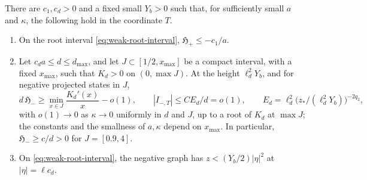 \begin{lemma}
\label{lem:weak-root-branches}
There are \(c_1,c_d>0\) and a fixed small \(Y_b>0\) such that, for
sufficiently small \(a\) and \(\kappa\), the following hold in the coordinate
\(T\).
\begin{enumerate}[label=\textup{(\roman*)}]
\item On the root interval \eqref{eq:weak-root-interval},
\(\mathfrak H_+\le-c_1/a\).
\item Let \(c_da\le d\le d_{\max}\), and let \(J\subset[1/2,x_{\max}]\) be
a compact interval, with a fixed \(x_{\max}\), such that \(K_d>0\) on
\((0,\max J)\). At the height \(\ell_d^2Y_b\), and for negative projected
states in \(J\),
\[
 d\,\mathfrak H_-\ge\min_{x\in J}\frac{K_d'(x)}x-o(1),\qquad
 |I_{-,T}|\le CE_d/d=o(1),\qquad
 E_d=\ell_d^2\bigl(z_*/(\ell_d^2Y_b)\bigr)^{-2q_2},
\]
with \(o(1)\to0\) as \(\kappa\to0\) uniformly in \(d\) and \(J\), up to a
root of \(K_d\) at \(\max J\); the constants and the smallness of
\(a,\kappa\) depend on \(x_{\max}\). In particular,
\(\mathfrak H_-\ge c/d>0\) for \(J=[0.9,4]\).
\item On \eqref{eq:weak-root-interval}, the negative graph has
\(z<(Y_b/2)|\eta|^2\) at \(|\eta|=\ell c_d\).
\end{enumerate}
\end{lemma}

